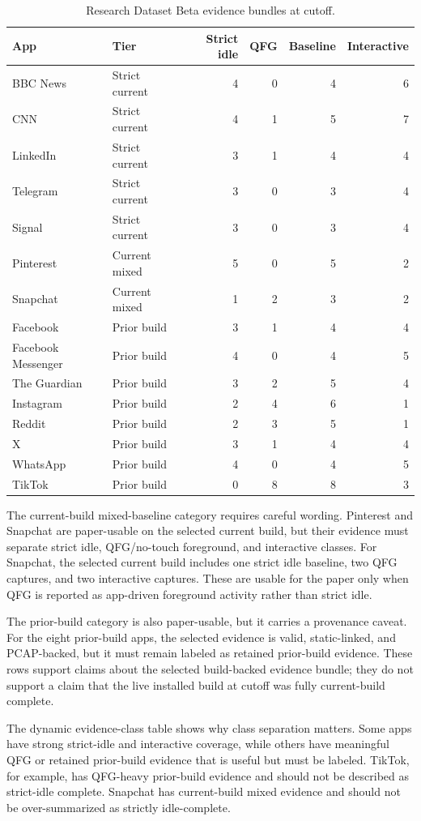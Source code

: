 \begin{table}[t]
\caption{Research Dataset Beta evidence bundles at cutoff.}
\label{tab:cohort-evidence-bundles}
\centering
\scriptsize
\begin{tabular}{llrrrr}
\toprule
App & Tier & Strict idle & QFG & Baseline & Interactive \\
\midrule
BBC News & Strict current & 4 & 0 & 4 & 6 \\
CNN & Strict current & 4 & 1 & 5 & 7 \\
LinkedIn & Strict current & 3 & 1 & 4 & 4 \\
Telegram & Strict current & 3 & 0 & 3 & 4 \\
Signal & Strict current & 3 & 0 & 3 & 4 \\
Pinterest & Current mixed & 5 & 0 & 5 & 2 \\
Snapchat & Current mixed & 1 & 2 & 3 & 2 \\
Facebook & Prior build & 3 & 1 & 4 & 4 \\
Facebook Messenger & Prior build & 4 & 0 & 4 & 5 \\
The Guardian & Prior build & 3 & 2 & 5 & 4 \\
Instagram & Prior build & 2 & 4 & 6 & 1 \\
Reddit & Prior build & 2 & 3 & 5 & 1 \\
X & Prior build & 3 & 1 & 4 & 4 \\
WhatsApp & Prior build & 4 & 0 & 4 & 5 \\
TikTok & Prior build & 0 & 8 & 8 & 3 \\
\bottomrule
\end{tabular}
\end{table}

The current-build mixed-baseline category requires careful wording. Pinterest and Snapchat are paper-usable on the selected current build, but their evidence must separate strict idle, QFG/no-touch foreground, and interactive classes. For Snapchat, the selected current build includes one strict idle baseline, two QFG captures, and two interactive captures. These are usable for the paper only when QFG is reported as app-driven foreground activity rather than strict idle.

The prior-build category is also paper-usable, but it carries a provenance caveat. For the eight prior-build apps, the selected evidence is valid, static-linked, and PCAP-backed, but it must remain labeled as retained prior-build evidence. These rows support claims about the selected build-backed evidence bundle; they do not support a claim that the live installed build at cutoff was fully current-build complete.

The dynamic evidence-class table shows why class separation matters. Some apps have strong strict-idle and interactive coverage, while others have meaningful QFG or retained prior-build evidence that is useful but must be labeled. TikTok, for example, has QFG-heavy prior-build evidence and should not be described as strict-idle complete. Snapchat has current-build mixed evidence and should not be over-summarized as strictly idle-complete.
